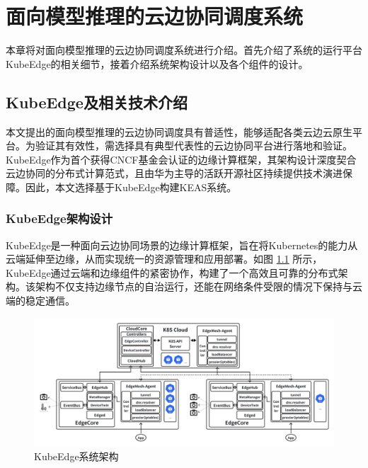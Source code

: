 \chapter{面向模型推理的云边协同调度系统}

本章将对面向模型推理的云边协同调度系统进行介绍。首先介绍了系统的运行平台KubeEdge的相关细节，接着介绍系统架构设计以及各个组件的设计。

\section{KubeEdge及相关技术介绍}

本文提出的面向模型推理的云边协同调度具有普适性，能够适配各类云边云原生平台。为验证其有效性，需选择具有典型代表性的云边协同平台进行落地和验证。KubeEdge作为首个获得CNCF基金会认证的边缘计算框架，其架构设计深度契合云边协同的分布式计算范式，且由华为主导的活跃开源社区持续提供技术演进保障。因此，本文选择基于KubeEdge构建KEAS系统。

\subsection{KubeEdge架构设计}

KubeEdge是一种面向云边协同场景的边缘计算框架，旨在将Kubernetes的能力从云端延伸至边缘，从而实现统一的资源管理和应用部署。如图 \ref{fig:4-1kubeedge} 所示，KubeEdge通过云端和边缘组件的紧密协作，构建了一个高效且可靠的分布式架构。该架构不仅支持边缘节点的自治运行，还能在网络条件受限的情况下保持与云端的稳定通信。

\begin{figure}[ht]
  \centering
  \includegraphics[width=\textwidth]{pics/4-1kubeedge.png}
  \caption{KubeEdge系统架构\cite{xiong2018extend}}
  \label{fig:4-1kubeedge}
\end{figure}




